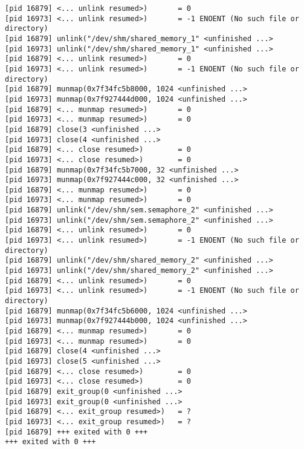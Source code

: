 \documentclass[a4paper, 12pt]{article}
\begin{document}
\begin{lstlisting}
[pid 16879] <... unlink resumed>)       = 0
[pid 16973] <... unlink resumed>)       = -1 ENOENT (No such file or directory)
[pid 16879] unlink("/dev/shm/shared_memory_1" <unfinished ...>
[pid 16973] unlink("/dev/shm/shared_memory_1" <unfinished ...>
[pid 16879] <... unlink resumed>)       = 0
[pid 16973] <... unlink resumed>)       = -1 ENOENT (No such file or directory)
[pid 16879] munmap(0x7f34fc5b8000, 1024 <unfinished ...>
[pid 16973] munmap(0x7f927444d000, 1024 <unfinished ...>
[pid 16879] <... munmap resumed>)       = 0
[pid 16973] <... munmap resumed>)       = 0
[pid 16879] close(3 <unfinished ...>
[pid 16973] close(4 <unfinished ...>
[pid 16879] <... close resumed>)        = 0
[pid 16973] <... close resumed>)        = 0
[pid 16879] munmap(0x7f34fc5b7000, 32 <unfinished ...>
[pid 16973] munmap(0x7f927444c000, 32 <unfinished ...>
[pid 16879] <... munmap resumed>)       = 0
[pid 16973] <... munmap resumed>)       = 0
[pid 16879] unlink("/dev/shm/sem.semaphore_2" <unfinished ...>
[pid 16973] unlink("/dev/shm/sem.semaphore_2" <unfinished ...>
[pid 16879] <... unlink resumed>)       = 0
[pid 16973] <... unlink resumed>)       = -1 ENOENT (No such file or directory)
[pid 16879] unlink("/dev/shm/shared_memory_2" <unfinished ...>
[pid 16973] unlink("/dev/shm/shared_memory_2" <unfinished ...>
[pid 16879] <... unlink resumed>)       = 0
[pid 16973] <... unlink resumed>)       = -1 ENOENT (No such file or directory)
[pid 16879] munmap(0x7f34fc5b6000, 1024 <unfinished ...>
[pid 16973] munmap(0x7f927444b000, 1024 <unfinished ...>
[pid 16879] <... munmap resumed>)       = 0
[pid 16973] <... munmap resumed>)       = 0
[pid 16879] close(4 <unfinished ...>
[pid 16973] close(5 <unfinished ...>
[pid 16879] <... close resumed>)        = 0
[pid 16973] <... close resumed>)        = 0
[pid 16879] exit_group(0 <unfinished ...>
[pid 16973] exit_group(0 <unfinished ...>
[pid 16879] <... exit_group resumed>)   = ?
[pid 16973] <... exit_group resumed>)   = ?
[pid 16879] +++ exited with 0 +++
+++ exited with 0 +++
\end{lstlisting}
\end{document}
